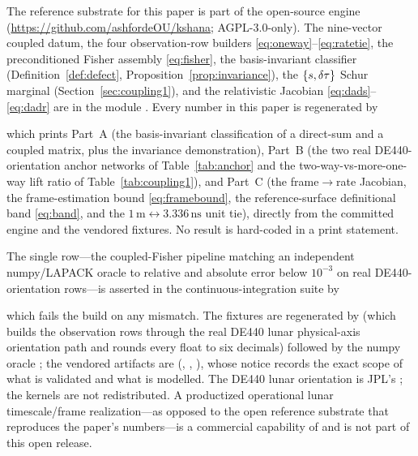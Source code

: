 \label{sec:availability}
The reference substrate for this paper is part of the open-source  engine
\citep{baweja2026kshana} (\url{https://github.com/ashfordeOU/kshana}; AGPL-3.0-only). The
nine-vector coupled datum, the four observation-row builders
\eqref{eq:oneway}--\eqref{eq:ratetie}, the preconditioned Fisher assembly
 \eqref{eq:fisher}, the basis-invariant classifier
 (Definition~\ref{def:defect},
Proposition~\ref{prop:invariance}), the $\{s,\delta\tau\}$ Schur marginal
 (Section~\ref{sec:coupling1}), and the relativistic
Jacobian  \eqref{eq:dads}--\eqref{eq:dadr} are in the module
. Every number in this paper is regenerated by
\begin{quote}
\end{quote}
which prints Part~A (the basis-invariant classification of a direct-sum and a coupled
matrix, plus the invariance demonstration), Part~B (the two real DE440-orientation anchor
networks of Table~\ref{tab:anchor} and the two-way-vs-more-one-way lift ratio of
Table~\ref{tab:coupling1}), and Part~C (the frame$\to$rate Jacobian, the frame-estimation
bound \eqref{eq:framebound}, the reference-surface definitional band \eqref{eq:band}, and
the $1\,\text{m}\leftrightarrow3.336\,\text{ns}$ unit tie), directly from the committed
engine and the vendored fixtures. No result is hard-coded in a print statement.

The single \Validated{} row---the coupled-Fisher pipeline matching an independent
numpy/LAPACK oracle to relative and absolute error below $10^{-3}$ on real
DE440-orientation rows---is asserted in the continuous-integration suite by
\begin{quote}
\end{quote}
which fails the build on any mismatch. The fixtures are regenerated by
 (which builds the observation rows
through the real DE440 lunar physical-axis orientation path and rounds every float to six
decimals) followed by the numpy oracle ; the
vendored artifacts are  (,
, ), whose notice records the exact scope of what is
validated and what is modelled. The DE440 lunar orientation is JPL's
\citep{park2021de440}; the kernels are not redistributed. A productized operational lunar
timescale/frame realization---as opposed to the open reference substrate that reproduces the
paper's numbers---is a commercial capability of  and is not part of this
open release.
